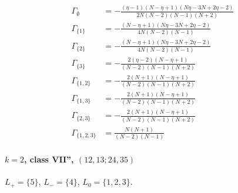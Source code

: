 \documentclass[11pt]{article}
\begin{document}
\begin{align*}
  \Gamma_{\emptyset} &= - \frac{\left(\eta - 1\right) \left(N - \eta + 1\right) \left(N \eta - 3 N + 2 \eta - 2\right)}{2 N \left(N - 2\right) \left(N - 1\right) \left(N + 2\right)} \\
  \Gamma_{\{1\}} &= - \frac{\left(N - \eta + 1\right) \left(N \eta - 3 N + 2 \eta - 2\right)}{4 N \left(N - 2\right) \left(N - 1\right)} \\
  \Gamma_{\{2\}} &= - \frac{\left(N - \eta + 1\right) \left(N \eta - 3 N + 2 \eta - 2\right)}{4 N \left(N - 2\right) \left(N - 1\right)} \\
  \Gamma_{\{3\}} &= - \frac{2 \left(\eta - 2\right) \left(N - \eta + 1\right)}{\left(N - 2\right) \left(N - 1\right) \left(N + 2\right)} \\
  \Gamma_{\{1,2\}} &= - \frac{2 \left(N + 1\right) \left(N - \eta + 1\right)}{\left(N - 2\right) \left(N - 1\right) \left(N + 2\right)} \\
  \Gamma_{\{1,3\}} &= - \frac{2 \left(N + 1\right) \left(N - \eta + 1\right)}{\left(N - 2\right) \left(N - 1\right) \left(N + 2\right)} \\
  \Gamma_{\{2,3\}} &= - \frac{2 \left(N + 1\right) \left(N - \eta + 1\right)}{\left(N - 2\right) \left(N - 1\right) \left(N + 2\right)} \\
  \Gamma_{\{1,2,3\}} &= \frac{N \left(N + 1\right)}{\left(N - 2\right) \left(N - 1\right)} 
\end{align*}

\paragraph{$k=2$, class VII'', $(12,13;24,35)$}

$L_+=\{5\}$, $L_-=\{4\}$, $L_0=\{1,2,3\}$.
\end{document}

